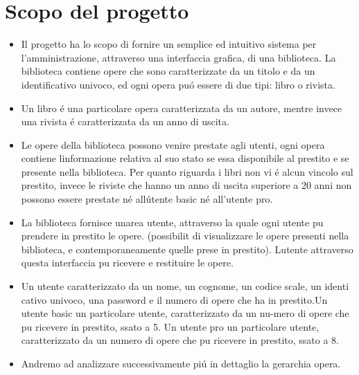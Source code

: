 \documentclass[10pt]{article}
\begin{document}
\section{Scopo del progetto}
\begin{itemize}
\item Il progetto ha lo scopo di fornire un semplice ed intuitivo sistema per l'amministrazione, attraverso una interfaccia grafica, di una biblioteca. La biblioteca contiene opere che sono caratterizzate da un titolo e da un identificativo univoco, ed ogni opera pu\'o essere di due tipi: libro o rivista.

\item Un libro \'e una particolare opera caratterizzata da un autore, mentre invece una rivista \'e caratterizzata da un anno di uscita.

\item Le opere della biblioteca possono venire prestate agli utenti, ogni opera contiene linformazione relativa al suo stato se essa disponibile al prestito e se presente nella biblioteca. Per quanto riguarda i libri non vi \'e alcun vincolo sul prestito, invece le riviste che hanno un anno di uscita superiore a 20 anni non possono essere prestate n\'e all\'utente basic n\'e all'utente pro.

\item La biblioteca fornisce unarea utente, attraverso la quale ogni utente pu prendere in prestito le opere. (possibilit di visualizzare le opere presenti nella biblioteca, e contemporaneamente quelle prese in prestito). Lutente attraverso questa interfaccia pu ricevere e restituire le opere.

\item Un utente caratterizzato da un nome, un cognome, un codice scale, un identi cativo univoco, una password e il numero di opere che ha in prestito.Un utente basic un particolare utente, caratterizzato da un nu-mero di opere che pu ricevere in prestito, ssato a 5. Un utente pro un particolare utente, caratterizzato da un numero di opere che pu ricevere in prestito, ssato a 8.

\item Andremo ad analizzare successivamente pi\'u in dettaglio la gerarchia opera.
\end{itemize}
\end{document}
